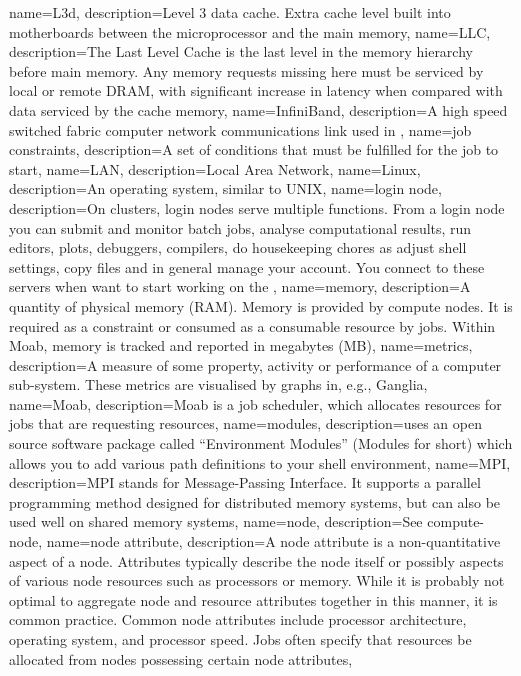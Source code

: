 {
  name={L3d},
  description={Level 3 data cache. Extra cache level built into motherboards between the microprocessor and the main memory},
}
{
  name={LLC},
  description={The Last Level Cache is the last level in the memory hierarchy before main memory. Any memory requests missing here must be serviced by local or remote DRAM, with significant increase in latency when compared with data serviced by the cache memory},
}
{
  name={InfiniBand},
  description={A high speed switched fabric computer network communications link used in \hpc},
}
{
  name={job constraints},
  description={A set of conditions that must be fulfilled for the job to start},
}
{
  name={LAN},
  description={Local Area Network},
}
{
  name={Linux},
  description={An operating system, similar to UNIX},
}
{
  name={login node},
  description={On \hpc clusters, login nodes serve multiple functions. From a login node you can submit and monitor batch jobs, analyse computational results, run editors, plots, debuggers, compilers, do housekeeping chores as adjust shell settings, copy files and in general manage your account. You connect to these servers when want to start working on the \hpcInfra},
}
{
  name={memory},
  description={A quantity of physical memory (RAM). Memory is provided by compute nodes. It is required as a constraint or consumed as a consumable resource by jobs. Within Moab, memory is tracked and reported in megabytes (MB)},
}
{
  name={metrics},
  description={A measure of some property, activity or performance of a computer sub-system. These metrics are visualised by graphs in, e.g., Ganglia},
}
{
  name={Moab},
  description={Moab is a job scheduler, which allocates resources for jobs that are requesting resources},
}
{
  name={modules},
  description={\hpc uses an open source software package called ``Environment Modules'' (Modules for short) which allows you to add various path definitions to your shell environment},
}
{
  name={MPI},
  description={MPI stands for Message-Passing Interface. It supports a parallel programming method designed for distributed memory systems, but can also be used well on shared memory systems},
}
{
  name={node},
  description={See \gls{compute-node}},
}
{
  name={node attribute},
  description={A node attribute is a non-quantitative aspect of a node. Attributes typically describe the node itself or possibly aspects of various node resources such as processors or memory. While it is probably not optimal to aggregate node and resource attributes together in this manner, it is common practice. Common node attributes include processor architecture, operating system, and processor speed. Jobs often specify that resources be allocated from nodes possessing certain node attributes},
}
